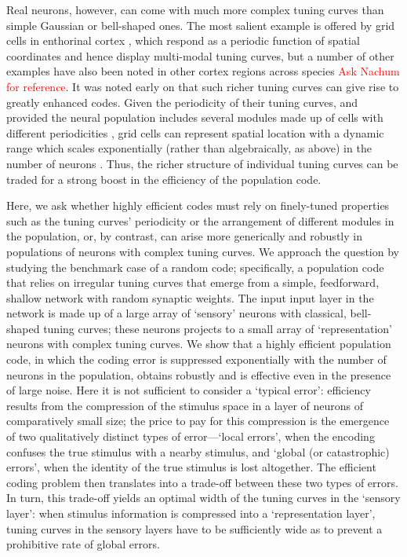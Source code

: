 \documentclass[a4paper]{article}%
\begin{document}
Real neurons, however, can come with much more complex tuning curves than
simple Gaussian or bell-shaped ones. The most salient example is offered by
grid cells in enthorinal cortex
\cite[]{Hafting2005MicrostructureCortex,Killian2012ACortex,Yartsev2011GridBats,Doeller2010EvidenceNetwork}, which respond as a periodic function of spatial coordinates
and hence display multi-modal tuning curves, but a number of other examples
have also been noted in other cortex regions across species \cite[]{Kadia2003SpectralCharacteristics,Sofroniew2015NeuralLocomotion,Lalazar2016TuningConnectivity,Gaucher2020ComplexitySpecies}\textcolor{red}{Ask Nachum for reference}. It was noted early on that such richer tuning curves
can give rise to greatly enhanced codes. Given the periodicity of their tuning
curves, and provided the neural population includes several modules made up of
cells with different periodicities \cite[]{Fiete2008WhatLocation,Wei2015ACells},
grid cells can represent spatial location with a dynamic range which scales 
exponentially (rather than algebraically, as above) in the number of neurons
\cite[]{Burak2014SpatialCortex,Sreenivasan2011GridComputation,Mathis2012ResolutionNeurons}. Thus, the
richer structure of individual tuning curves can be traded for a strong boost
in the efficiency of the population code.

Here, we ask whether highly efficient codes must rely on finely-tuned
properties such as the tuning curves' periodicity or the arrangement of
different modules in the population, or, by contrast, can arise more
generically and robustly in populations of neurons with complex tuning curves.
We approach the question by studying the benchmark case of a random code;
specifically, a population code that relies on irregular tuning curves that
emerge from a simple, feedforward, shallow network with random synaptic
weights. The input input layer in the network is made up of a large array of
`sensory' neurons with classical, bell-shaped tuning curves; these neurons
projects to a small array of `representation' neurons with complex tuning
curves. We show that a highly efficient population code, in which the coding
error is suppressed exponentially with the number of neurons in the
population, obtains robustly and is effective even in the presence of large
noise. 
Here it is not sufficient to consider a `typical error': efficiency
results from the compression of the stimulus space in a layer of neurons of
comparatively small size; the price to pay for this compression is the
emergence of two qualitatively distinct types of error---`local errors', when
the encoding confuses the true stimulus with a nearby stimulus, and `global
(or catastrophic) errors', when the identity of the true stimulus is lost
altogether. The efficient coding problem then translates into a trade-off
between these two types of errors. In turn, this trade-off yields an optimal
width of the tuning curves in the `sensory layer': when stimulus information is
compressed into a `representation layer', tuning curves in the sensory layers
have to be sufficiently wide as to prevent a prohibitive rate of global errors.
\end{document}
